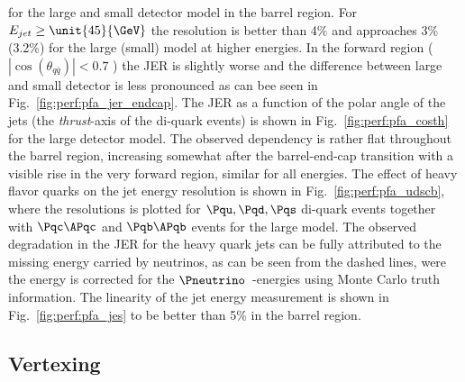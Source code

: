 for the large and small detector model in the barrel region. For $E_{jet}\geq \unit{45}{\GeV}$ the resolution is better than 4\% and
approaches 3\% (3.2\%) for the large (small) model at higher energies. In the forward region ( $|\cos(\theta_{q\bar q})|<0.7$ ) the JER is
slightly worse and the difference between large and small detector is less pronounced as can bee seen in Fig.~\ref{fig:perf:pfa_jer_endcap}.
The JER as a function of the polar angle of the jets (the {\em thrust}-axis of the di-quark events) is shown in Fig.~\ref{fig:perf:pfa_costh} for the
large detector model. The observed dependency is rather flat throughout the barrel region, increasing somewhat after the barrel-end-cap transition
with a visible rise in the very forward region, similar for all energies. The effect of heavy flavor quarks on the jet energy resolution is shown in
Fig.~\ref{fig:perf:pfa_udscb}, where the resolutions is plotted for $\Pqu,\Pqd,\Pqs$ di-quark events together with $\Pqc\APqc$ and $\Pqb\APqb$ events for the large model.
The observed degradation in the JER for the heavy quark jets can be fully attributed to the missing energy carried by neutrinos,
as can be seen from the dashed lines, were the energy is corrected for the $\Pneutrino$~-energies using Monte Carlo truth information.
The linearity of the jet energy measurement is shown in Fig.~\ref{fig:perf:pfa_jes} to be better than 5\% in the barrel region.


\subsection{Vertexing}

